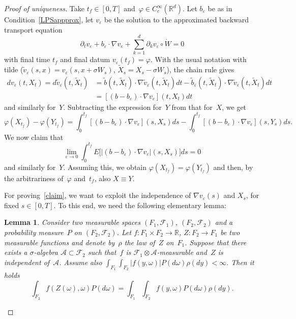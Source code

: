 \documentclass[a4paper,10pt]{article}
\newtheorem{lemma}[theorem]{Lemma}
\newcommand\1{\mathbbm{1}}
\newcommand{\mc}{\mathcal}
\newcommand{\td}{\tilde}
\newcommand{\eps}{\varepsilon}
\numberwithin{equation}{section}
\begin{document}
\begin{proof}[Proof of uniqueness]
Take $t_f \in [0,T]$ and~$\varphi \in C^\infty_c(\mathbb{R}^d)$. Let $b_\eps$ be as in Condition~\ref{LPSappprox}, let $v_\eps$ be the solution to the approximated backward transport equation
\begin{equation*}
\partial_t v_\eps +b_\eps\cdot\nabla v_\eps +\sum^d_{k=1}\partial_k v_\eps\circ\dot{W} =0
\end{equation*}
with final time $t_f$ and final datum $v_\eps(t_f)=\varphi$. With the usual notation with tilde ($\td{v}_\eps(s,x)=v_\eps(s,x+\sigma W_s)$, $\td{X}_s=X_s-\sigma W_s$), the chain rule gives
\begin{align*}
dv_\eps(t,X_t)= d\td{v}_\eps(t,\td{X}_t) & = \td{b}(t,\td{X}_t)\cdot\nabla \td{v}_\eps(t,\td{X}_t)dt -\td{b}_\eps(t,\td{X}_t)\cdot\nabla \td{v}_\eps(t,\td{X}_t)dt \\	
  & = [(b-b_\eps)\cdot\nabla v_\eps](t,X_t)dt
\end{align*}
and similarly for~$Y$. Subtracting the expression for~$Y$ from that for~$X$, we get
\begin{equation*}
\varphi(X_{t_f})-\varphi(Y_{t_f})=\int^{t_f}_0[(b-b_\eps)\cdot\nabla v_\eps](s,X_s)ds-\int^{t_f}_0[(b-b_\eps)\cdot\nabla v_\eps](s,Y_s)ds .
\end{equation*}
We now claim that
\begin{equation}
\lim_{\eps\rightarrow0}\int^{t_f}_0 E \big[ |(b-b_\eps)\cdot\nabla v_\eps|(s,X_s) \big] ds=0\label{claim}
\end{equation}
and similarly for~$Y$. Assuming this, we obtain $\varphi(X_{t_f})=\varphi(Y_{t_f})$ and then, by the arbitrariness of~$\varphi$ and~$t_f$, also $X\equiv Y$.

For proving~\eqref{claim}, we want to exploit the independence of $\nabla v_\eps(s)$ and $X_s$, for fixed $s \in [0,T]$. To this end, we need the following elementary lemma:

\begin{lemma}\label{indep}
Consider two measurable spaces $(F_1,\mc{F}_1)$, $(F_2,\mc{F}_2)$ and a probability measure~$P$ on $(F_2,\mc{F}_2)$. Let $f \colon F_1 \times F_2 \rightarrow\mathbb{R}$, $Z \colon F_2\rightarrow F_1$ be two measurable functions and denote by~$\rho$ the law of~$Z$ on~$F_1$. Suppose that there exists a $\sigma$-algebra $\mc{A} \subset \mc{F}_2$ such that~$f$ is $\mc{F}_1\otimes\mc{A}$-measurable and~$Z$ is independent of~$\mc{A}$. Assume also $\int_{F_1} \int_{F_2}|f(y,\omega)|P(d\omega)\rho(dy)<\infty$. Then it holds
\begin{equation*}
\int_{F_2} f(Z(\omega),\omega) P(d\omega)=\int_{F_1} \int_{F_2} f(y,\omega) P(d\omega) \rho(dy) .
\end{equation*}
\end{lemma}


\end{proof}
\end{document}
